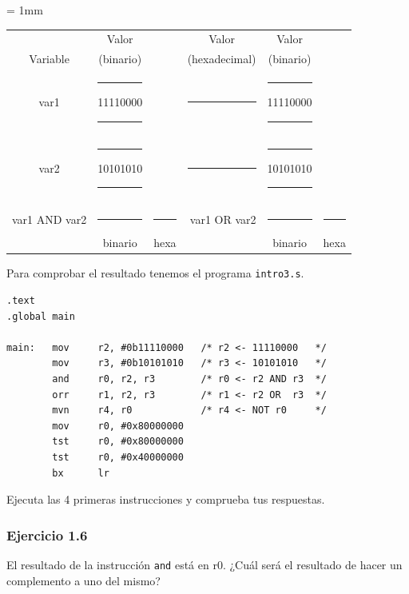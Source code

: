 \begin{center}
\small
\colorbox[gray]{0.9}{
\tabcolsep = 1mm
\begin{tabular}{cccccc}
         & Valor     & & Valor         & Valor     & \\
Variable & (binario) & & (hexadecimal) & (binario) & \\
var1 &
\colorbox[gray]{1}{\rule{0.3cm}{0cm}\rule{0cm}{0.46cm}11110000\rule{0.3cm}{0cm}}
& &
\colorbox[gray]{1}{\rule{2cm}{0cm}\rule{0cm}{0.46cm}} &
\colorbox[gray]{1}{\rule{0.3cm}{0cm}\rule{0cm}{0.46cm}11110000\rule{0.3cm}{0cm}}
& \\[1mm]
var2 &
\colorbox[gray]{1}{\rule{0.3cm}{0cm}\rule{0cm}{0.46cm}10101010\rule{0.3cm}{0cm}}
& &
\colorbox[gray]{1}{\rule{2cm}{0cm}\rule{0cm}{0.46cm}} &
\colorbox[gray]{1}{\rule{0.3cm}{0cm}\rule{0cm}{0.46cm}10101010\rule{0.3cm}{0cm}}
& \\[1mm]
\cline{2-3}\cline{5-6}\\[-3mm]
\multicolumn{1}{r}{var1 AND var2} &
\colorbox[gray]{1}{\rule{2cm}{0cm}\rule{0cm}{0.46cm}} &
\colorbox[gray]{1}{\rule{1cm}{0cm}\rule{0cm}{0.46cm}} &
\multicolumn{1}{r}{var1 OR var2} &
\colorbox[gray]{1}{\rule{2cm}{0cm}\rule{0cm}{0.46cm}} &
\colorbox[gray]{1}{\rule{1cm}{0cm}\rule{0cm}{0.46cm}} \\
& binario & hexa & & binario & hexa \\
\end{tabular}
}
\end{center}

Para comprobar el resultado tenemos el programa {\tt intro3.s}.

\begin{lstlisting}[caption={Código del programa intro3.s},label={lst:codigoPract3}]
.text
.global main
 
main:   mov     r2, #0b11110000   /* r2 <- 11110000   */
        mov     r3, #0b10101010   /* r3 <- 10101010   */
        and     r0, r2, r3        /* r0 <- r2 AND r3  */
        orr     r1, r2, r3        /* r1 <- r2 OR  r3  */
        mvn     r4, r0            /* r4 <- NOT r0     */
        mov     r0, #0x80000000
        tst     r0, #0x80000000
        tst     r0, #0x40000000
        bx      lr
\end{lstlisting}

Ejecuta las 4 primeras instrucciones y comprueba tus respuestas.

\subsubsection{Ejercicio 1.6}
El resultado de la instrucción {\tt and} está en r0. ¿Cuál será el resultado
de hacer un complemento a uno del mismo?

